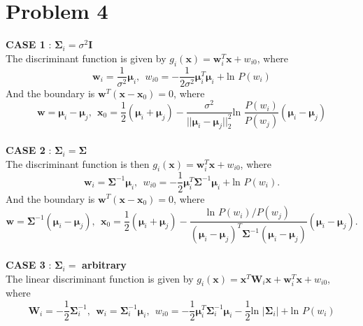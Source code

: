 \documentclass[12pt]{article}
\begin{document}
\section{Problem 4}
\textbf{CASE 1} : $\bm{\Sigma}_i=\sigma^2\bm{\text{I}}$\\
The discriminant function is given by  $g_i(\textbf{x})=\textbf{w}_i^T\textbf{x}+w_{i0}$, where 
\begin{equation*}
\textbf{w}_i=\frac{1}{\sigma^2} \bm{\mu}_i,\ \ 
w_{i0}=-\frac{1}{2\sigma^2} \bm{\mu}_i^T \bm{\mu}_i+\text{ln } P(w_i)
\end{equation*}
And the boundary is $\textbf{w}^T(\textbf{x}-\textbf{x}_0)=0$, where 
\begin{equation*}
\textbf{w}=\bm{\mu}_i-\bm{\mu}_j,\ \ \bm{x}_0=\frac{1}{2}(\bm{\mu}_i+\bm{\mu}_j)-\frac{\sigma^2}{||\bm{\mu}_i-\bm{\mu}_j||_2^2}\text{ln }\frac{P(w_i)}{P(w_j)}(\bm{\mu}_i-\bm{\mu}_j)
\end{equation*}
\\
\noindent \textbf{CASE 2} : $\bm{\Sigma}_i=\bm{\Sigma}$\\
The discriminant function is then  $g_i(\textbf{x})=\textbf{w}_i^T\textbf{x}+w_{i0}$, where 
\begin{equation*}
\textbf{w}_i=\bm{\Sigma}^{-1}\bm{\mu}_i,\ \ 
w_{i0}=-\frac{1}{2}  \bm{\mu}_i^T \bm{\Sigma}^{-1} \bm{\mu}_i+\text{ln }P(w_i).
\end{equation*}
And the boundary is $\textbf{w}^T(\textbf{x}-\textbf{x}_0)=0$, where 
\begin{equation*}
\textbf{w}=\bm{\Sigma}^{-1}(\bm{\mu}_i-\bm{\mu}_j),\ \ \bm{x}_0=\frac{1}{2}(\bm{\mu}_i+\bm{\mu}_j)-\frac{\text{ln }P(w_i)/P(w_j)}{(\bm{\mu}_i-\bm{\mu}_j)^T\bm{\Sigma}^{-1}(\bm{\mu}_i-\bm{\mu}_j)}(\bm{\mu}_i-\bm{\mu}_j).
\end{equation*}
\\
\noindent \textbf{CASE 3} : $\bm{\Sigma}_i=$ \textbf{arbitrary}\\
The linear discriminant function is given by  $g_i(\textbf{x})=\textbf{x}^T\bm{W}_i\textbf{x}+\textbf{w}_i^T\textbf{x}+w_{i0}$, where 
\begin{equation*}
\bm{W}_i=-\frac{1}{2}\bm{\Sigma}_i^{-1},\ \ 
\textbf{w}_i=\bm{\Sigma}_i^{-1}\bm{\mu}_i,\ \ 
w_{i0}=-\frac{1}{2}  \bm{\mu}_i^T \bm{\Sigma}_i^{-1} \bm{\mu}_i -\frac{1}{2}\text{ln } |\bm{\Sigma}_i|+\text{ln }P(w_i)
\end{equation*}
\end{document}
